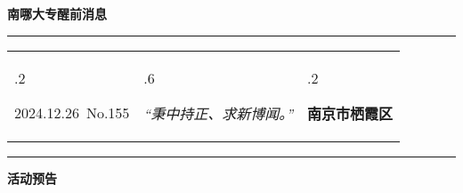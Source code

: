 \documentclass[letterpaper, 12pt]{article}
\begin{document}
\begin{center}
    \Huge\textbf{南哪大专醒前消息}
\end{center}
\vspace{4mm}
\hrule
\renewcommand\tabularxcolumn[1]{m{#1}}
\begin{tabularx}{\textwidth}{>{\hsize.2\hsize}X>{\hsize.6\hsize}X>{\hsize.2\hsize}X}
    \begin{flushleft}
        2024.12.26\, No.155
    \end{flushleft}
    &
    \begin{center}
        \textit{“秉中持正、求新博闻。”}
    \end{center}
    &
    \begin{flushright}
        \textbf{南京市栖霞区}
    \end{flushright}
\end{tabularx}
\vspace{-3.5mm}
\hrule
\vspace{4mm}
\centerline{\huge\textbf{活动预告}}
\end{document}
